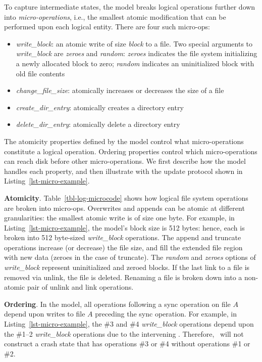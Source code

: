 To capture intermediate states, the model breaks logical operations further
down into \textit{micro-operations}, i.e., the smallest atomic modification
that can be performed upon each logical entity. There are four such micro-ops: 
\begin{itemize}[topsep=0pt, itemsep=-1ex, partopsep=1ex, parsep=1ex]
\item \textit{write\_block}: an atomic write of size \textit{block} to a
  file. Two special arguments to \textit{write\_block} are \textit{zeroes} and
  \textit{random}: \textit{zeroes} indicates the file system initializing a
  newly allocated block to zero; \textit{random} indicates an uninitialized
  block with old file contents
\item \textit{change\_file\_size}: atomically increases or decreases the size
  of a file
\item \textit{create\_dir\_entry}: atomically creates a directory entry
\item \textit{delete\_dir\_entry}: atomically delete a directory entry
\end{itemize}

The atomicity properties defined by the model control what micro-operations
constitute a logical operation. Ordering properties control which
micro-operations can reach disk before other micro-operations. We first
describe how the model handles each property, and then illustrate with the
update protocol shown in Listing~\ref{lst-micro-example}.

\textbf{Atomicity}. Table~\ref{tbl-log-microcode} shows how logical file
system operations are broken into micro-ops. Overwrites and appends can be
atomic at different granularities: the smallest atomic write is of size one
byte. For example, in Listing~\ref{lst-micro-example}, the model's block size
is 512 bytes: hence, each  is broken into 512 byte-sized
\textit{write\_block} operations. The append and truncate operations increase
(or decrease) the file size, and fill the extended file region with new data
(zeroes in the case of truncate). The \textit{random} and \textit{zeroes}
options of \textit{write\_block} represent uninitialized and
zeroed blocks. If the last link to a file is removed via unlink, the file is
deleted. Renaming a file is broken down into a non-atomic pair of unlink and
link operations.

\textbf{Ordering}. In the model, all operations following a sync operation on
file $A$ depend upon writes to file $A$ preceding the sync operation. For
example, in Listing~\ref{lst-micro-example}, the \#3 and \#4
\textit{write\_block} operations depend upon the \#1--2 \textit{write\_block}
operations due to the intervening . Therefore, \toolname\ will
not construct a crash state that has operations \#3 or \#4 without operations
\#1 or \#2. 

